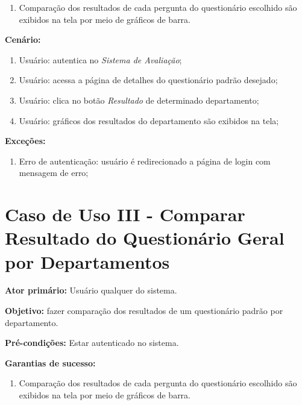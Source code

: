 \documentclass[
  12pt,       %
  openright,      %
  oneside,      %
  a4paper,      %
  english,      %
  french,        %
  spanish,     %
  brazil        %
  ]{abntex2-decsi}
\begin{document}
\begin{apendicesenv}
            \begin{enumerate}
            
            \item Comparação dos resultados de cada pergunta do questionário escolhido são exibidos na tela por meio de gráficos de barra.  
            
            \end{enumerate}
        
		\textbf{Cenário:}
		
		\begin{enumerate}
			\item Usuário: autentica no \textit{Sistema de Avaliação};           
			\item Usuário: acessa a página de detalhes do questionário padrão desejado;
            \item Usuário: clica no botão \textit{Resultado} de determinado departamento;
			\item Usuário: gráficos dos resultados do departamento são exibidos na tela;
		\end{enumerate}
		
		\textbf{Exceções:}
		
			\begin{enumerate}	
				\item Erro de autenticação: usuário é redirecionado a página de login com mensagem de erro;
			\end{enumerate}

	\newpage
    
    \section{Caso de Uso III - Comparar Resultado do Questionário Geral por Departamentos}
    
	\textbf{Ator primário:} Usuário qualquer do sistema.
				
    \textbf{Objetivo:} fazer comparação dos resultados de um questionário padrão por departamento.
    
	\textbf{Pré-condições:} Estar autenticado no sistema.
		
	\textbf{Garantias de sucesso:} 
        
            \begin{enumerate}
            
            \item Comparação dos resultados de cada pergunta do questionário escolhido são exibidos na tela por meio de gráficos de barra.  
            

\end{enumerate}
\end{apendicesenv}
\end{document}
